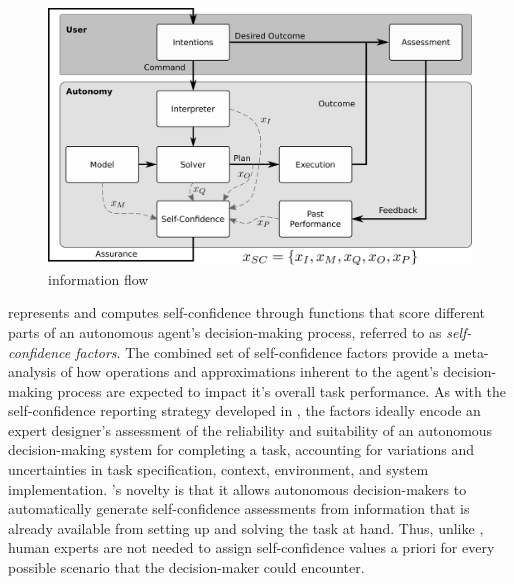 
\begin{figure}[tbp]
        \centering
        \includegraphics[width=0.75\linewidth]{Figures/FaMSeC.png}
        \caption{\famsec{} information flow}
        \label{fig:famsec}
        \vspace{-0.5 cm}
\end{figure}

\famsec{} represents and computes self-confidence through functions that score different parts of an autonomous agent's decision-making process, referred to as \emph{self-confidence factors}. The combined set of self-confidence factors provide a meta-analysis of how operations and approximations inherent to the agent's decision-making process are expected to impact it's overall task performance. 
As with the self-confidence reporting strategy developed in \cite{Hutchins2015-if}, the factors ideally encode an expert designer's assessment of the reliability and suitability of an autonomous decision-making system for completing a task, accounting for variations and uncertainties in task specification, context, environment, and system implementation. \famsec{}'s novelty is that it allows autonomous decision-makers to automatically generate self-confidence assessments from information that is already available from setting up and solving the task at hand. Thus, unlike \cite{Hutchins2015-if}, human experts are not needed to assign self-confidence values a priori for every possible scenario that the decision-maker could encounter. %

